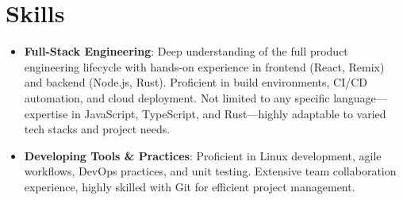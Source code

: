 \documentclass{resume}
\newcommand{\en}[1]{#1}
\newcommand{\zh}[1]{}
\begin{document}
\section{\en{Skills}\zh{技能}}
\begin{itemize}[parsep=0.25ex]
      \item \en{\textbf{Full-Stack Engineering}: Deep understanding of the full product engineering lifecycle with hands-on experience in frontend (React, Remix) and backend (Node.js, Rust). Proficient in build environments, CI/CD automation, and cloud deployment. Not limited to any specific language—expertise in JavaScript, TypeScript, and Rust—highly adaptable to varied tech stacks and project needs.}
            \zh{\textbf{全栈工程能力}: 对产品全流程工程有深入理解，具备前端（如 React、Remix）和后端（如 Node.js、Rust）开发经验，熟悉构建环境、CI/CD 自动化与云端部署。不局限于特定语言，尤为熟悉 JavaScript、TypeScript、Rust，具备多语言开发能力，能够灵活适应不同技术栈和项目需求。}
      \item \en{\textbf{Developing Tools \& Practices}: Proficient in Linux development, agile workflows, DevOps practices, and unit testing. Extensive team collaboration experience, highly skilled with Git for efficient project management.}
            \zh{\textbf{开发工具与实践}: 精通 Linux 环境开发，熟练掌握敏捷开发流程、DevOps 实践及单元测试。团队协作经验丰富，擅长使用 Git 等工具高效管理项目。}
\end{itemize}
\end{document}

